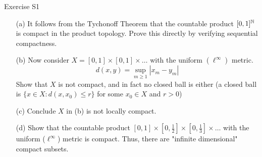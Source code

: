 \documentclass{hmwk}
\begin{document}
\begin{problem}{Exercise S1}
    \begin{itemize}
        \item[(a)] It follows from the Tychonoff Theorem that the countable product $[0, 1]^{\mathbb{N}}$ is compact in the product topology. Prove this directly by verifying sequential compactness. 
        \item[(b)] Now consider $X = [0, 1] \times [0, 1] \times \dots $ with the uniform $(\ell^\infty)$ metric. $$d(x, y) = \sup_{m \geq 1}|x_m - y_m|$$ Show that $X$ is not compact, and in fact no closed ball is either (a closed ball is $\{x \in X : d(x, x_0) \leq r\}$ for some $x_0 \in X$ and $r > 0$)
        \item[(c)] Conclude $X$ in (b) is not locally compact. 
        \item[(d)] Show that the countable product $[0, 1] \times [0, \frac{1}{2}] \times [0, \frac{1}{3}] \times \dots $ with the uniform ($\ell^\infty$) metric is compact. Thus, there are "infinite dimensional" compact subsets. 
    \end{itemize}
\end{problem}
\end{document}
